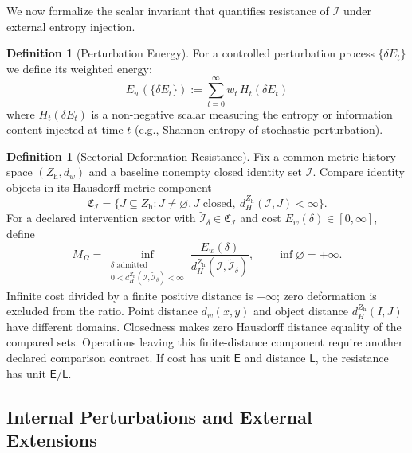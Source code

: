 \documentclass[11pt,a4paper]{article}
\theoremstyle{plain}
\theoremstyle{definition}
\newtheorem{definition}[theorem]{Definition}
\theoremstyle{remark}
\begin{document}
We now formalize the scalar invariant that quantifies resistance of $\mathcal{I}$ under external entropy injection.

\begin{definition}[Perturbation Energy]
For a controlled perturbation process $\{\delta E_t\}$ we define its weighted energy:
\begin{equation}
    E_w(\{\delta E_t\}) := \sum_{t=0}^{\infty} w_t \, H_t(\delta E_t)
\end{equation}
where $H_t(\delta E_t)$ is a non-negative scalar measuring the entropy or information content injected at time $t$ (e.g., Shannon entropy of stochastic perturbation).
\end{definition}

\begin{definition}[Sectorial Deformation Resistance]\label{def:ontmass}
Fix a common metric history space $(Z_{\mathrm h},d_w)$ and a baseline
nonempty closed identity set $\mathcal I$. Compare identity objects in its
Hausdorff metric component
\[
 \mathfrak C_{\mathcal I}=\{J\subseteq Z_{\mathrm h}:J\ne\varnothing,
 J\text{ closed},\ d_H^{Z_{\mathrm h}}(\mathcal I,J)<\infty\}.
\]
For a declared intervention sector with $\widetilde{\mathcal I}_\delta\in
\mathfrak C_{\mathcal I}$ and cost $E_w(\delta)\in[0,\infty]$, define
\[
 M_\Omega=\inf_{\substack{\delta\text{ admitted}\\
             0<d_H^{Z_{\mathrm h}}(\mathcal I,\widetilde{\mathcal I}_\delta)<\infty}}
 \frac{E_w(\delta)}{d_H^{Z_{\mathrm h}}(\mathcal I,\widetilde{\mathcal I}_\delta)},
 \qquad \inf\varnothing=+\infty.
\]
Infinite cost divided by a finite positive distance is $+\infty$; zero
deformation is excluded from the ratio. Point distance $d_w(x,y)$ and
object distance $d_H^{Z_{\mathrm h}}(I,J)$ have different domains.
Closedness makes zero Hausdorff distance equality of the compared sets.
Operations leaving this finite-distance component require another declared
comparison contract. If cost has unit $\mathsf E$ and distance $\mathsf L$,
the resistance has unit $\mathsf E/\mathsf L$.
\end{definition}

\subsection{Internal Perturbations and External Extensions}
\label{sec:internal-external}
\end{document}
